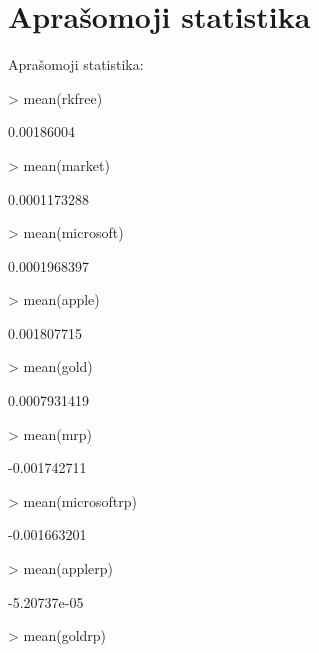 \documentclass[12pt, a14paper, lithuanian]{article}
\begin{document}
\newpage

\appendix

\section{Aprašomoji statistika}
\label{A 1}
Aprašomoji statistika:

\begin{Schunk}
\begin{Sinput}
> mean(rkfree)
\end{Sinput}
\begin{Soutput}
[1] 0.00186004
\end{Soutput}
\begin{Sinput}
> mean(market)
\end{Sinput}
\begin{Soutput}
[1] 0.0001173288
\end{Soutput}
\begin{Sinput}
> mean(microsoft)
\end{Sinput}
\begin{Soutput}
[1] 0.0001968397
\end{Soutput}
\begin{Sinput}
> mean(apple)
\end{Sinput}
\begin{Soutput}
[1] 0.001807715
\end{Soutput}
\begin{Sinput}
> mean(gold)
\end{Sinput}
\begin{Soutput}
[1] 0.0007931419
\end{Soutput}
\begin{Sinput}
> mean(mrp)
\end{Sinput}
\begin{Soutput}
[1] -0.001742711
\end{Soutput}
\begin{Sinput}
> mean(microsoftrp)
\end{Sinput}
\begin{Soutput}
[1] -0.001663201
\end{Soutput}
\begin{Sinput}
> mean(applerp)
\end{Sinput}
\begin{Soutput}
[1] -5.20737e-05
\end{Soutput}
\begin{Sinput}
> mean(goldrp)
\end{Sinput}
\begin{Soutput}

\end{Soutput}
\end{Schunk}
\end{document}
